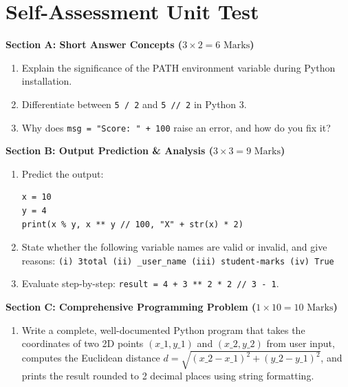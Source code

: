 \section{Self-Assessment Unit Test}

\begin{chaptertest}
\noindent\textbf{Section A: Short Answer Concepts ($3 \times 2 = 6\text{ Marks}$)}
\begin{enumerate}
    \item Explain the significance of the PATH environment variable during Python installation.
    \item Differentiate between \texttt{5 / 2} and \texttt{5 // 2} in Python 3.
    \item Why does \texttt{msg = "Score: " + 100} raise an error, and how do you fix it?
\end{enumerate}

\medskip
\noindent\textbf{Section B: Output Prediction \& Analysis ($3 \times 3 = 9\text{ Marks}$)}
\begin{enumerate}[start=4]
    \item Predict the output:
    \begin{lstlisting}[language=Python3]
x = 10
y = 4
print(x % y, x ** y // 100, "X" + str(x) * 2)
    \end{lstlisting}
    \item State whether the following variable names are valid or invalid, and give reasons:
    \texttt{(i) 3total \quad (ii) \_user\_name \quad (iii) student-marks \quad (iv) True}
    \item Evaluate step-by-step: \texttt{result = 4 + 3 ** 2 * 2 // 3 - 1}.
\end{enumerate}

\medskip
\noindent\textbf{Section C: Comprehensive Programming Problem ($1 \times 10 = 10\text{ Marks}$)}
\begin{enumerate}[start=7]
    \item Write a complete, well-documented Python program that takes the coordinates of two 2D points $(x\_1, y\_1)$ and $(x\_2, y\_2)$ from user input, computes the Euclidean distance $d = \sqrt{(x\_2-x\_1)^2 + (y\_2-y\_1)^2}$, and prints the result rounded to 2 decimal places using string formatting.
\end{enumerate}
\end{chaptertest}

